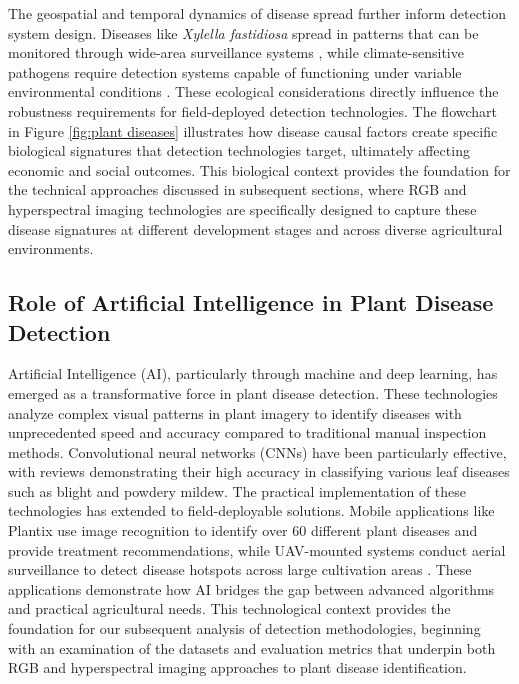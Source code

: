 \documentclass[sn-mathphys]{sn-jnl}
\theoremstyle{thmstyleone}%
\theoremstyle{thmstyletwo}%
\theoremstyle{thmstylethree}%
\begin{document}
The geospatial and temporal dynamics of disease spread further inform detection system design. Diseases like \textit{Xylella fastidiosa} spread in patterns that can be monitored through wide-area surveillance systems \citep{fisher2020threats}, while climate-sensitive pathogens require detection systems capable of functioning under variable environmental conditions \citep{willocquet2020polyetic}. These ecological considerations directly influence the robustness requirements for field-deployed detection technologies.
The flowchart in Figure \ref{fig:plant diseases} illustrates how disease causal factors create specific biological signatures that detection technologies target, ultimately affecting economic and social outcomes. This biological context provides the foundation for the technical approaches discussed in subsequent sections, where RGB and hyperspectral imaging technologies are specifically designed to capture these disease signatures at different development stages and across diverse agricultural environments.

\subsection{Role of Artificial Intelligence in Plant Disease Detection}
Artificial Intelligence (AI), particularly through machine and deep learning, has emerged as a transformative force in plant disease detection. These technologies analyze complex visual patterns in plant imagery to identify diseases with unprecedented speed and accuracy compared to traditional manual inspection methods. Convolutional neural networks (CNNs) have been particularly effective, with reviews demonstrating their high accuracy in classifying various leaf diseases such as blight and powdery mildew.
The practical implementation of these technologies has extended to field-deployable solutions. Mobile applications like Plantix \citep{rani2023role} use image recognition to identify over 60 different plant diseases and provide treatment recommendations, while UAV-mounted systems conduct aerial surveillance to detect disease hotspots across large cultivation areas \citep{sahoo2024transforming}. These applications demonstrate how AI bridges the gap between advanced algorithms and practical agricultural needs. This technological context provides the foundation for our subsequent analysis of detection methodologies, beginning with an examination of the datasets and evaluation metrics that underpin both RGB and hyperspectral imaging approaches to plant disease identification.
\end{document}
